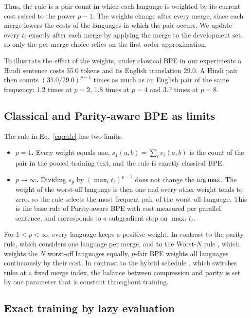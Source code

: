 Thus, the rule is a pair count in which each language is weighted by its current cost raised
to the power $p-1$. The weights change after every merge, since each merge lowers the costs
of the languages in which the pair occurs. We update every $t_\ell$ exactly after each merge
by applying the merge to the development set, so only the per-merge choice relies on the
first-order approximation.

To illustrate the effect of the weights, under classical BPE in our experiments a Hindi
sentence costs 35.0 tokens and its English translation 29.0. A Hindi pair then counts
$(35.0/29.0)^{p-1}$ times as much as an English pair of the same frequency: 1.2 times at
$p=2$, 1.8 times at $p=4$ and 3.7 times at $p=8$.

\subsection{Classical and Parity-aware BPE as limits}
\label{sec:limits}

The rule in Eq.~\eqref{eq:rule} has two limits.
\begin{itemize}
  \item \textbf{$p=1$.} Every weight equals one, $s_1(a,b)=\sum_\ell c_\ell(a,b)$ is the
  count of the pair in the pooled training text, and the rule is exactly classical BPE.
  \item \textbf{$p\to\infty$.} Dividing $s_p$ by $(\max_\ell t_\ell)^{p-1}$ does not
  change the $\operatorname*{arg\,max}$. The weight of the worst-off language is then one and every other
  weight tends to zero, so the rule selects the most frequent pair of the worst-off
  language. This is the base rule of Parity-aware BPE \citep{foroutan2026} with cost
  measured per parallel sentence, and corresponds to a subgradient step on
  $\max_\ell t_\ell$.
\end{itemize}
For $1<p<\infty$, every language keeps a positive weight. In contrast to the parity rule,
which considers one language per merge, and to the Worst-$N$ rule \citep{kanjirangat2026},
which weights the $N$ worst-off languages equally, $p$-fair BPE weights all languages
continuously by their cost. In contrast to the hybrid schedule \citep{foroutan2026}, which
switches rules at a fixed merge index, the balance between compression and parity is set by
one parameter that is constant throughout training.

\subsection{Exact training by lazy evaluation}
\label{sec:lazy}

